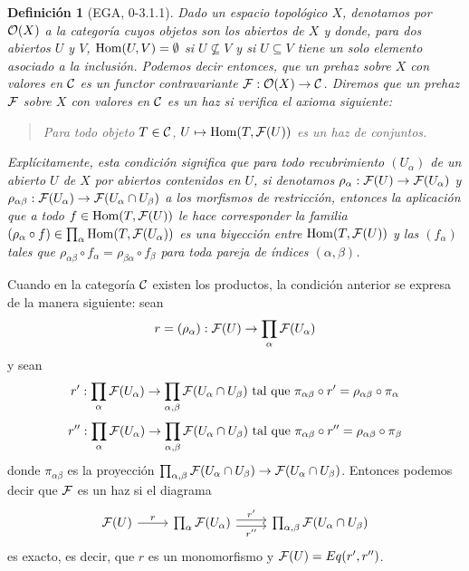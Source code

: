 \documentclass[twoside]{article}
\newtheorem{defin}{Definición}[section]
\begin{document}
\begin{defin}[EGA, 0-3.1.1]\label{axioma}
Dado un espacio topológico $X$, denotamos por ${\mathcal O}(X)$ a la categoría cuyos objetos son los abiertos de $X$ y donde, para dos abiertos $U$ y $V$, $\operatorname{Hom}(U,V)=\emptyset$ si $U\not\subseteq V$ y si $U\subseteq V$ tiene un solo elemento asociado a la inclusión. Podemos decir entonces, que un \emph{prehaz sobre $X$ con valores en ${\mathcal C}$} es un functor contravariante $\mathcal{F}:{\mathcal O}(X)\to{\mathcal C}$. Diremos que un prehaz $\mathcal{F}$ sobre $X$ con valores en ${\mathcal C}$ es un \emph{haz} si verifica el axioma siguiente:

\begin{verse}
Para todo objeto $T\in{\mathcal C}$, $U\mapsto\operatorname{Hom}(T,\mathcal{F}(U))$ es un haz de conjuntos. %
\end{verse}

Explícitamente, esta condición significa que para todo recubrimiento $(U_\alpha)$ de un abierto $U$ de $X$ por abiertos contenidos en $U$, si denotamos $\rho_\alpha:\mathcal{F}(U)\to\mathcal{F}(U_\alpha)$ y $\rho_{\alpha\beta}:\mathcal{F}(U_\alpha)\to\mathcal{F}(U_\alpha\cap U_\beta)$ a los morfismos de restricción, entonces la aplicación que a todo $f\in\operatorname{Hom}(T,\mathcal{F}(U))$ le hace corresponder la familia $(\rho_\alpha\circ f)\in \prod_\alpha\operatorname{Hom}(T,\mathcal{F}(U_\alpha))$ es una biyección entre $\operatorname{Hom}(T,\mathcal{F}(U))$ y las $(f_\alpha)$ tales que $\rho_{\alpha\beta}\circ f_\alpha=\rho_{\beta\alpha}\circ f_\beta$ para toda pareja de índices $(\alpha,\beta)$. 
\end{defin}

\begin{observacion}\label{ecualizador}
Cuando en la categoría ${\mathcal C}$ existen los productos, la condición anterior se expresa de la manera siguiente: sean
\[
r=(\rho_\alpha):\mathcal{F}(U)\to\prod_\alpha\mathcal{F}(U_\alpha)
\]
y sean
\[
r':\prod_\alpha\mathcal{F}(U_\alpha)\to\prod_{\alpha,\beta}\mathcal{F}(U_\alpha\cap U_\beta)\text{ tal que }\pi_{\alpha\beta}\circ r'=\rho_{\alpha\beta}\circ \pi_{\alpha}
\]
\[
r'':\prod_\alpha\mathcal{F}(U_\alpha)\to\prod_{\alpha,\beta}\mathcal{F}(U_\alpha\cap U_\beta)\text{ tal que }\pi_{\alpha\beta}\circ r''=\rho_{\alpha\beta}\circ \pi_{\beta}
\]
donde $\pi_{\alpha\beta}$ es la proyección $\prod_{\alpha,\beta}\mathcal{F}(U_\alpha\cap U_\beta)\to \mathcal{F}(U_\alpha\cap U_\beta)$. Entonces podemos decir que $\mathcal{F}$ es un haz si el diagrama
\[
\begin{tikzcd}
\calF(U)\arrow[r, "r"]&\prod_\alpha\calF(U_\alpha)\arrow[r, shift left, "r'"]\arrow[r, shift right, "r''"'] &\prod_{\alpha,\beta}\calF(U_\alpha\cap U_\beta)
\end{tikzcd}
\]
es exacto, es decir, que $r$ es un monomorfismo y $\mathcal{F}(U)=Eq(r',r'')$. %
\end{observacion}
\end{document}
